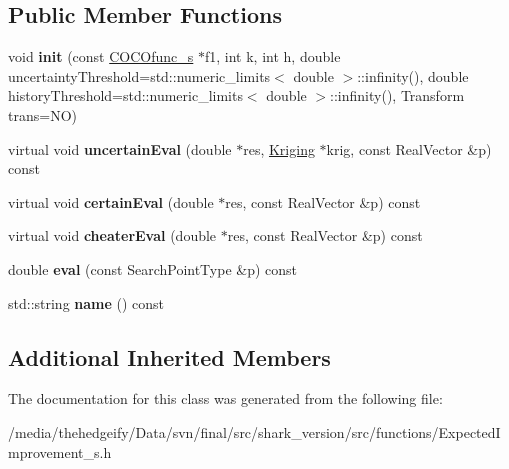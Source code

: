 \subsection*{Public Member Functions}
\begin{DoxyCompactItemize}
\item 
void {\bfseries init} (const \hyperlink{classCOCOfunc__s}{C\+O\+C\+Ofunc\+\_\+s} $\ast$f1, int k, int h, double uncertainty\+Threshold=std\+::numeric\+\_\+limits$<$ double $>$\+::infinity(), double history\+Threshold=std\+::numeric\+\_\+limits$<$ double $>$\+::infinity(), Transform trans=NO)\hypertarget{classExpectedImprovement__s_a9da58204b16ba15ccc230d8e30585ccb}{}\label{classExpectedImprovement__s_a9da58204b16ba15ccc230d8e30585ccb}

\item 
virtual void {\bfseries uncertain\+Eval} (double $\ast$res, \hyperlink{classKriging}{Kriging} $\ast$krig, const Real\+Vector \&p) const \hypertarget{classExpectedImprovement__s_a9722d6e7af88941ce4d3e0d3453598ae}{}\label{classExpectedImprovement__s_a9722d6e7af88941ce4d3e0d3453598ae}

\item 
virtual void {\bfseries certain\+Eval} (double $\ast$res, const Real\+Vector \&p) const \hypertarget{classExpectedImprovement__s_ad8c9c6770c288291c660e4b0c0dfd386}{}\label{classExpectedImprovement__s_ad8c9c6770c288291c660e4b0c0dfd386}

\item 
virtual void {\bfseries cheater\+Eval} (double $\ast$res, const Real\+Vector \&p) const \hypertarget{classExpectedImprovement__s_aa86b8e5ff6d549a16a628b1bc27194eb}{}\label{classExpectedImprovement__s_aa86b8e5ff6d549a16a628b1bc27194eb}

\item 
double {\bfseries eval} (const Search\+Point\+Type \&p) const \hypertarget{classExpectedImprovement__s_ae721ef51ac52611f6209f5698343b70d}{}\label{classExpectedImprovement__s_ae721ef51ac52611f6209f5698343b70d}

\item 
std\+::string {\bfseries name} () const \hypertarget{classExpectedImprovement__s_a922117d103bb194728251a72e0602fac}{}\label{classExpectedImprovement__s_a922117d103bb194728251a72e0602fac}

\end{DoxyCompactItemize}
\subsection*{Additional Inherited Members}


The documentation for this class was generated from the following file\+:\begin{DoxyCompactItemize}
\item 
/media/thehedgeify/\+Data/svn/final/src/shark\+\_\+version/src/functions/Expected\+Improvement\+\_\+s.\+h\end{DoxyCompactItemize}
